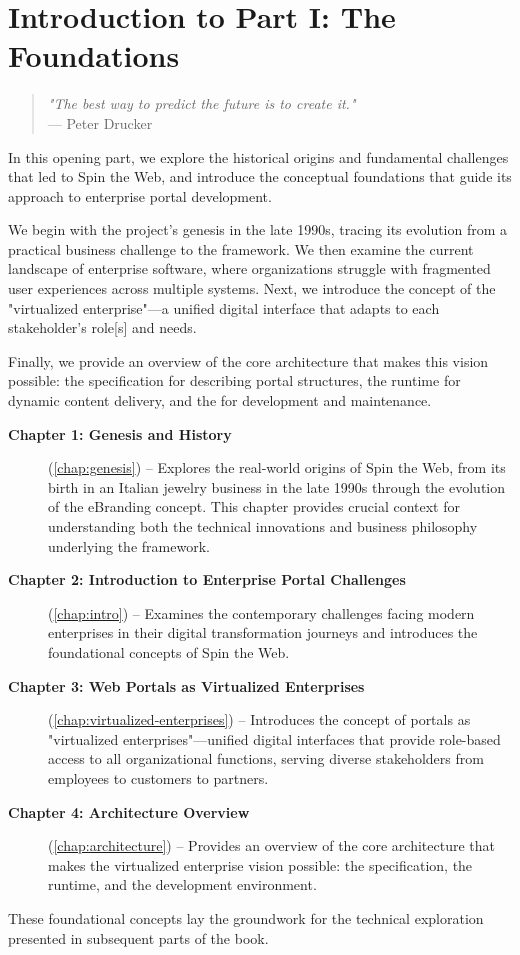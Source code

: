 
\chapter*{Introduction to Part I: The Foundations}
\label{part:foundations}

\begin{quote}
\textit{"The best way to predict the future is to create it."} \\
— Peter Drucker
\end{quote}

In this opening part, we explore the historical origins and fundamental challenges that led to Spin the Web, and introduce the conceptual foundations that guide its approach to enterprise portal development.

We begin with the project's genesis in the late 1990s, tracing its evolution from a practical business challenge to the framework. We then examine the current landscape of enterprise software, where organizations struggle with fragmented user experiences across multiple systems. Next, we introduce the concept of the "virtualized enterprise"—a unified digital interface that adapts to each stakeholder's role[s] and needs.

Finally, we provide an overview of the core architecture that makes this vision possible: the \wbdl{} specification for describing portal structures, the \webspinner{} runtime for dynamic content delivery, and the \studio{} for development and maintenance.

\begin{description}
\item[\textbf{Chapter 1: Genesis and History}] (\cref{chap:genesis}) -- Explores the real-world origins of Spin the Web, from its birth in an Italian jewelry business in the late 1990s through the evolution of the eBranding concept. This chapter provides crucial context for understanding both the technical innovations and business philosophy underlying the framework.

\item[\textbf{Chapter 2: Introduction to Enterprise Portal Challenges}] (\cref{chap:intro}) -- Examines the contemporary challenges facing modern enterprises in their digital transformation journeys and introduces the foundational concepts of Spin the Web.

\item[\textbf{Chapter 3: Web Portals as Virtualized Enterprises}] (\cref{chap:virtualized-enterprises}) -- Introduces the concept of portals as "virtualized enterprises"—unified digital interfaces that provide role-based access to all organizational functions, serving diverse stakeholders from employees to customers to partners.

\item[\textbf{Chapter 4: Architecture Overview}] (\cref{chap:architecture}) -- Provides an overview of the core architecture that makes the virtualized enterprise vision possible: the \wbdl{} specification, the \webspinner{} runtime, and the \studio{} development environment.
\end{description}

These foundational concepts lay the groundwork for the technical exploration presented in subsequent parts of the book.
